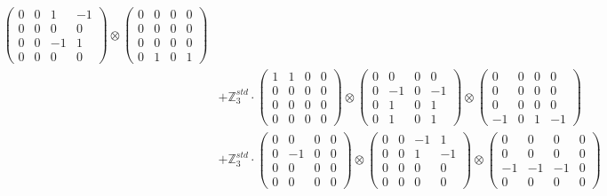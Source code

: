 \documentclass{article}
\begin{document}
{\begin{align}
            \begin{pmatrix} 0 & 0 & 1 & -1 \\ 0 & 0 & 0 & 0 \\ 0 & 0 & -1 & 1 \\ 0 & 0 & 0 & 0 \end{pmatrix} \otimes 
            \begin{pmatrix} 0 & 0 & 0 & 0 \\ 0 & 0 & 0 & 0 \\ 0 & 0 & 0 & 0 \\ 0 & 1 & 0 & 1 \end{pmatrix} \\ 
        &+ \label{Rs1-Rc16-Solution-4-c10} \mathbb{Z}_3^{std} \cdot 
            \begin{pmatrix} 1 & 1 & 0 & 0 \\ 0 & 0 & 0 & 0 \\ 0 & 0 & 0 & 0 \\ 0 & 0 & 0 & 0 \end{pmatrix} \otimes 
            \begin{pmatrix} 0 & 0 & 0 & 0 \\ 0 & -1 & 0 & -1 \\ 0 & 1 & 0 & 1 \\ 0 & 1 & 0 & 1 \end{pmatrix} \otimes 
            \begin{pmatrix} 0 & 0 & 0 & 0 \\ 0 & 0 & 0 & 0 \\ 0 & 0 & 0 & 0 \\ -1 & 0 & 1 & -1 \end{pmatrix} \\ 
        &+ \label{Rs1-Rc16-Solution-4-c11} \mathbb{Z}_3^{std} \cdot 
            \begin{pmatrix} 0 & 0 & 0 & 0 \\ 0 & -1 & 0 & 0 \\ 0 & 0 & 0 & 0 \\ 0 & 0 & 0 & 0 \end{pmatrix} \otimes 
            \begin{pmatrix} 0 & 0 & -1 & 1 \\ 0 & 0 & 1 & -1 \\ 0 & 0 & 0 & 0 \\ 0 & 0 & 0 & 0 \end{pmatrix} \otimes 
            \begin{pmatrix} 0 & 0 & 0 & 0 \\ 0 & 0 & 0 & 0 \\ -1 & -1 & -1 & 0 \\ 0 & 0 & 0 & 0 \end{pmatrix} \\ 

\end{align}}
\end{document}
